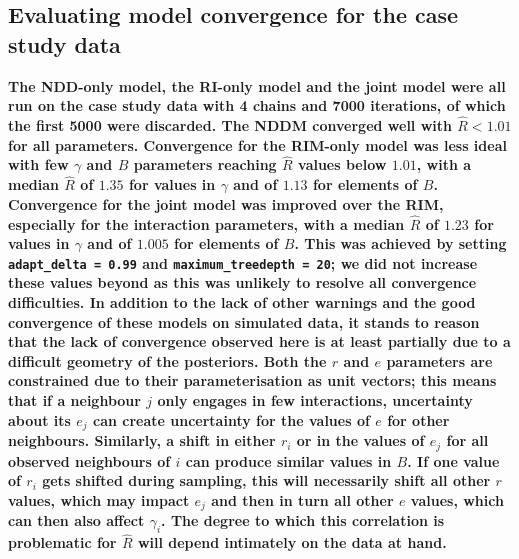 \begin{refsection}
    \subsection{Evaluating model convergence for the case study data}
    \label{SI:convergence}


    \textbf{The NDD-only model, the RI-only model and the joint model were all run on the case study data with 4 chains and 7000 iterations, of which the first 5000 were discarded. The NDDM converged well with $\hat{R} < 1.01$ for all parameters. Convergence for the RIM-only model was less ideal with few $\gamma$ and $B$ parameters reaching  $\hat{R}$ values below $1.01$, with a median $\hat{R}$ of $1.35$ for values in $\gamma$ and of $1.13$ for elements of $B$. Convergence for the joint model was improved over the RIM, especially for the interaction parameters, with a median $\hat{R}$ of $1.23$ for  values in $\gamma$ and of $1.005$ for elements of $B$. This was achieved by setting \texttt{adapt\_delta = 0.99} and \texttt{maximum\_treedepth = 20}; we did not increase these values beyond as this was unlikely to resolve all convergence difficulties. In addition to the lack of other warnings and the good convergence of these models on simulated data, it stands to reason that the lack of convergence observed here is at least partially due to a difficult geometry of the posteriors. Both the $r$ and $e$ parameters are constrained due to their parameterisation as unit vectors; this means that if a neighbour $j$ only engages in few interactions, uncertainty about its $e_j$ can create uncertainty for the values of $e$ for other neighbours. Similarly, a shift in either $r_i$ or in the values of $e_j$ for all observed neighbours of $i$ can produce similar values in $B$. If one value of $r_i$ gets shifted during sampling, this will necessarily shift all other $r$ values, which may impact $e_j$ and then in turn all other $e$ values, which can then also affect $\gamma_i$. The degree to which this correlation is problematic for $\hat{R}$ will depend intimately on the data at hand.} 


\end{refsection}
